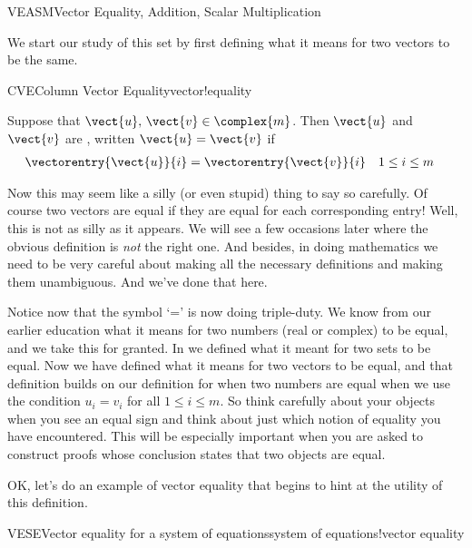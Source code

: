 %
\begin{subsect}{VEASM}{Vector Equality, Addition, Scalar Multiplication}
%
\begin{para}We start our study of this set by first defining what it means for two vectors to be the same.\end{para}
%
\begin{definition}{CVE}{Column Vector Equality}{vector!equality}
\begin{para}Suppose that $\vect{u},\,\vect{v}\in\complex{m}$.  Then $\vect{u}$ and $\vect{v}$ are , written $\vect{u}=\vect{v}$ if
%
\begin{align*}
\vectorentry{\vect{u}}{i}&=\vectorentry{\vect{v}}{i}
&&1\leq i\leq m
\end{align*}\end{para}
%
\end{definition}
%
\begin{para}Now this may seem like a silly (or even stupid) thing to say so carefully.  Of course two vectors are equal if they are equal for each corresponding entry!  Well, this is not as silly as it appears.  We will see a few occasions later where the obvious definition is {\em not} the right one.  And besides, in doing mathematics we need to be very careful about making all the necessary definitions and making them unambiguous.  And we've done that here.\end{para}
%
\begin{para}Notice now that the symbol `=' is now doing triple-duty.  We know from our earlier education what it means for two numbers (real or complex) to be equal, and we take this for granted.  In  we defined what it meant for two sets to be equal.  Now we have defined what it means for two vectors to be equal, and that definition builds on our definition for when two numbers are equal when we use the condition $u_i=v_i$ for all $1\leq i\leq m$.  So think carefully about your objects when you see an equal sign and think about just which notion of equality you have encountered.  This will be especially important when you are asked to construct proofs whose conclusion states that two objects are equal.\end{para}
%
\begin{para}OK, let's do an example of vector equality that begins to hint at the utility of this definition.\end{para}
%
\begin{example}{VESE}{Vector equality for a system of equations}{system of equations!vector equality}

\end{example}
\end{subsect}
